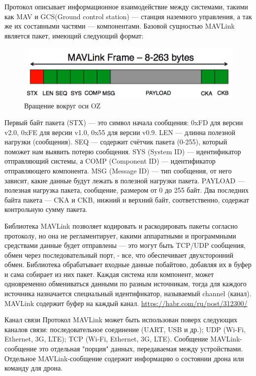 Протокол описывает информационное взаимодействие между системами, такими как MAV и GCS(Ground control station) — станция наземного управления, а так же их составными частями — компонентами. Базовой сущностью MAVLink является пакет, имеющий следующий формат:

\begin{figure}[H]
	\centering
	\includegraphics[width=0.5\linewidth]{pics/mavlink}
	\caption{Вращение вокруг оси OZ
	}
	\label{fig:mavlink}
\end{figure}

Первый байт пакета (STX) — это символ начала сообщения: 0xFD для версии v2.0, 0xFE для версии v1.0, 0x55 для версии v0.9. LEN — длинна полезной нагрузки (сообщения). SEQ — содержит счётчик пакета (0-255), который поможет нам выявить потерю сообщения. SYS (System ID) — идентификатор отправляющий системы, а COMP (Component ID) — идентификатор отправляющего компонента. MSG (Message ID) — тип сообщения, от него зависит, какие данные будут лежать в полезной нагрузки пакета. PAYLOAD — полезная нагрузка пакета, сообщение, размером от 0 до 255 байт. Два последних байта пакета — CKA и CKB, нижний и верхний байт, соответственно, содержат контрольную сумму пакета.

Библиотека MAVLink позволяет кодировать и раскодировать пакеты согласно протоколу, но она не регламентирует, какими аппаратными и программными средствами данные будет отправлены — это могут быть TCP/UDP сообщения, обмен через последовательный порт, - все, что обеспечивает двухсторонний обмен. Библиотека обрабатывает входные данные побайтово, добавляя их в буфер и сама собирает из них пакет. Каждая система или компонент, может одновременно обмениваться данными по разным источникам, тогда для каждого источника назначается специальный идентификатор, называемый channel (канал). MAVLink содержит буфер на каждый канал.
\url{https://habr.com/ru/post/312300/}

Канал связи
Протокол MAVLink может быть использован поверх следующих каналов связи:
последовательное соединение (UART, USB и др.);
UDP (Wi-Fi, Ethernet, 3G, LTE);
TCP (Wi-Fi, Ethernet, 3G, LTE).
Сообщение
MAVLink-сообщение это отдельная "порция" данных, передаваемая между устройствами. Отдельное MAVLink-сообщение содержит информацию о состоянии дрона или команду для дрона.

